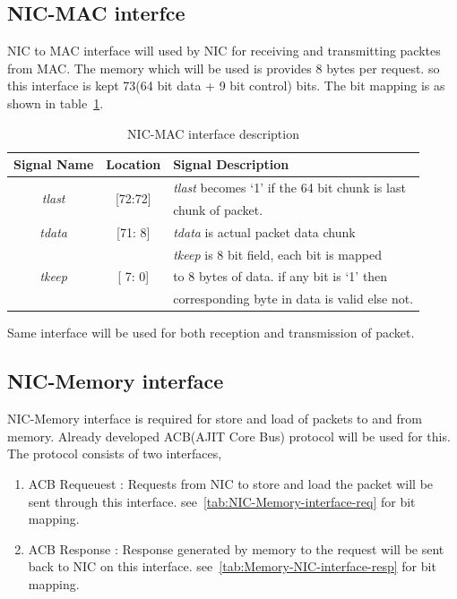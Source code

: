 \documentclass[12pt]{report}
\begin{document}
		\subsection{NIC-MAC interfce}
			NIC to MAC interface will used by NIC for receiving and transmitting packtes from MAC. The memory which will be used is provides 8 bytes per request.
			so this interface is kept 73(64 bit data + 9 bit control) bits. The bit mapping is as shown in table~\ref{tab:NIC-MAC-interface}.
				\begin{table}[!htbp]
					\centering
					\begin{tabular}{ccl}
						\hline
						\textbf{Signal Name} & \textbf{Location} &\textbf{Signal Description}  \\ \hline
						\multirow{2}{*}{\textit{tlast}}	& \multirow{2}{*}{[72:72]}	& \textit{tlast} becomes `1' if the 64 bit chunk is last\\
										& 				& chunk of packet.\\ \hline
						\textit{tdata}   		& [71: 8] 			& \textit{tdata} is actual packet data chunk\\ \hline
						\multirow{3}{*}{\textit{tkeep}}	& \multirow{3}{*}{[ 7: 0]}	& \textit{tkeep} is 8 bit field, each bit is mapped\\
										&				& to 8 bytes of data. if any bit is `1' then\\
										& 				& corresponding byte in data is valid else not.\\ \hline 
					\end{tabular}
					\caption{NIC-MAC interface description}
					\label{tab:NIC-MAC-interface}
				\end{table}
			Same interface will be used for both reception and transmission of packet.

		\subsection{NIC-Memory interface}
			NIC-Memory interface is required for store and load of packets to and from memory. Already developed ACB(AJIT Core Bus) protocol will be used for this.
			The protocol consists of two interfaces,
			\begin{enumerate}
				\item ACB Requeuest : Requests from NIC to store and load the packet will be sent through this interface. see~\ref{tab:NIC-Memory-interface-req} for bit mapping.
				\item ACB Response : Response generated by memory to the request will be sent back to NIC on this interface. see~\ref{tab:Memory-NIC-interface-resp} for bit mapping.
			\end{enumerate}
\end{document}
